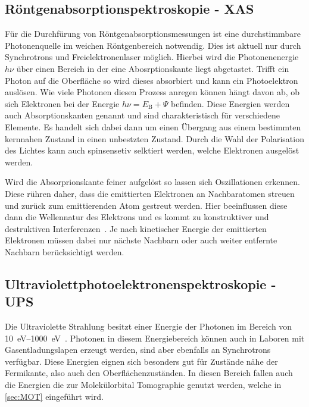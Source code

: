         \subsection{Röntgenabsorptionspektroskopie - XAS}
            Für die Durchfürung von Röntgenabsorptionsmessungen ist eine durchstimmbare Photonenquelle im weichen Röntgenbereich notwendig.
            Dies ist aktuell nur durch Synchrotrons und Freielektronenlaser möglich.
            Hierbei wird die Photonenenergie $h\nu$ über einen Bereich in der eine Abosrptionskante liegt abgetastet.
            Trifft ein Photon auf die Oberfläche so wird dieses absorbiert und kann ein Photoelektron auslösen.
            Wie viele Photonen diesen Prozess anregen können hängt davon ab, ob sich Elektronen bei der Energie $h\nu = E_\text{B}+\Psi$ befinden.
            Diese Energien werden auch Absorptionskanten genannt und sind charakteristisch für verschiedene Elemente. 
            Es handelt sich dabei dann um einen Übergang aus einem bestimmten kernnahen Zustand in einen unbestzten Zustand.
            Durch die Wahl der Polarisation des Lichtes kann auch spinsensetiv selktiert werden, welche Elektronen ausgelöst werden.

            Wird die Absorprionskante feiner aufgelöst so lassen sich Oszillationen erkennen.
            Diese rühren daher, dass die emittierten Elektronen an Nachbaratomen streuen und zurück zum emittierenden Atom gestreut werden.
            Hier beeinflussen diese dann die Wellennatur des Elektrons und es kommt zu konstruktiver und destruktiven Interferenzen~\cite{Fauster}.
            Je nach kinetischer Energie der emittierten Elektronen müssen dabei nur nächste Nachbarn oder auch weiter entfernte Nachbarn berücksichtigt werden.

        \subsection{Ultraviolettphotoelektronenspektroskopie - UPS}
            Die Ultraviolette Strahlung besitzt einer Energie der Photonen im Bereich von \SIrange{10}{1000}{\electronvolt}~\cite{Fauster}.
            Photonen in diesem Energiebereich können auch in Laboren mit Gasentladungslapen erzeugt werden, sind aber ebenfalls an Synchrotrons verfügbar.
            Diese Energien eignen sich besonders gut für Zustände nähe der Fermikante, also auch den Oberflächenzuständen.
            In diesen Bereich fallen auch die Energien die zur Molekülorbital Tomographie genutzt werden, welche in \autoref{sec:MOT} eingeführt wird.

